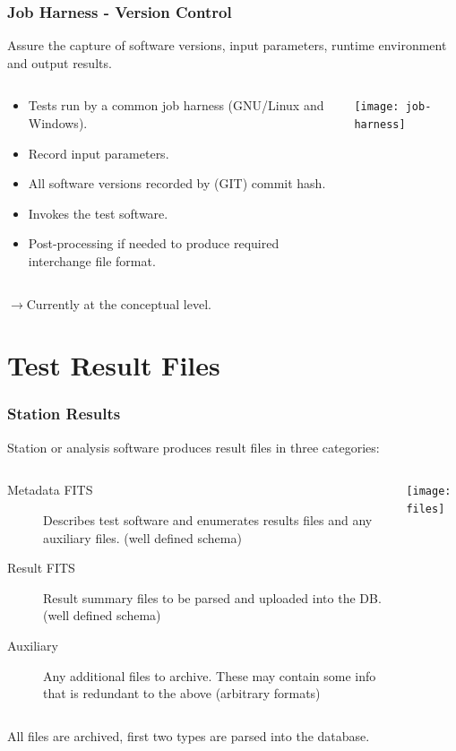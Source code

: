 \documentclass[xcolor=dvipsnames]{beamer}
\begin{document}
\begin{frame}[fragile]
  \frametitle{Job Harness - Version Control} 

  Assure the capture of software versions, input parameters, runtime
  environment and output results.

  \begin{columns}
    \begin{column}{0.5\paperwidth}
      \begin{itemize}
      \item Tests run by a common job harness (GNU/Linux and Windows).
      \item Record input parameters.
      \item All software versions recorded by (GIT) commit hash.
      \item Invokes the test software.
      \item Post-processing if needed to produce required interchange
        file format.
      \end{itemize}
    \end{column}
    \begin{column}{0.5\paperwidth}
      \texttt{[image: job-harness]}
    \end{column}
  \end{columns}

  \vspace{2mm}

  $\rightarrow$Currently at the conceptual level.
\end{frame}

\section{Test Result Files}

\begin{frame}
  \frametitle{Station Results}

  Station or analysis software produces result files in three categories:

  \begin{columns}
    \begin{column}{0.5\paperwidth}
      \footnotesize
      \begin{description}
      \item[Metadata FITS] Describes test software and enumerates results
        files and any auxiliary files.  (well defined schema)
      \item[Result FITS] Result summary files to be parsed and uploaded
        into the DB. (well defined schema)
      \item[Auxiliary] Any additional files to archive. These may
        contain some info that is redundant to the above (arbitrary
        formats)
      \end{description}
    \end{column}
    \begin{column}{0.4\paperwidth}
      \texttt{[image: files]}
    \end{column}
  \end{columns}
  All files are archived, first two types are parsed into the database.

\end{frame}
\end{document}

